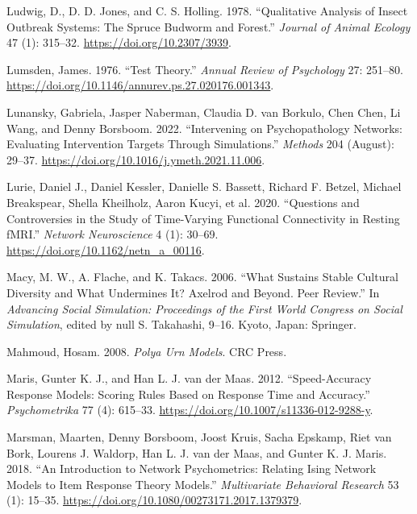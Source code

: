 \documentclass[
  a4paper,
  DIV=11,
  numbers=noendperiod,
  oneside]{scrreprt}
\newlength{\cslhangindent}
\newenvironment{CSLReferences}[2] %
 {\begin{list}{}{%
  \setlength{\itemindent}{0pt}
  \setlength{\leftmargin}{0pt}
  \setlength{\parsep}{0pt}
  \ifodd #1
   \setlength{\leftmargin}{\cslhangindent}
   \setlength{\itemindent}{-1\cslhangindent}
  \fi
  \setlength{\itemsep}{#2\baselineskip}}}
 {\end{list}}
\begin{document}
\begin{CSLReferences}{1}{0}
Ludwig, D., D. D. Jones, and C. S. Holling. 1978. {``Qualitative
Analysis of Insect Outbreak Systems: The Spruce Budworm and Forest.''}
\emph{Journal of Animal Ecology} 47 (1): 315--32.
\url{https://doi.org/10.2307/3939}.

Lumsden, James. 1976. {``Test Theory.''} \emph{Annual Review of
Psychology} 27: 251--80.
\url{https://doi.org/10.1146/annurev.ps.27.020176.001343}.

Lunansky, Gabriela, Jasper Naberman, Claudia D. van Borkulo, Chen Chen,
Li Wang, and Denny Borsboom. 2022. {``Intervening on Psychopathology
Networks: {Evaluating} Intervention Targets Through Simulations.''}
\emph{Methods} 204 (August): 29--37.
\url{https://doi.org/10.1016/j.ymeth.2021.11.006}.

Lurie, Daniel J., Daniel Kessler, Danielle S. Bassett, Richard F.
Betzel, Michael Breakspear, Shella Kheilholz, Aaron Kucyi, et al. 2020.
{``Questions and Controversies in the Study of Time-Varying Functional
Connectivity in Resting {fMRI}.''} \emph{Network Neuroscience} 4 (1):
30--69. \url{https://doi.org/10.1162/netn_a_00116}.

Macy, M. W., A. Flache, and K. Takacs. 2006. {``What {Sustains Stable
Cultural Diversity} and {What Undermines It}? {Axelrod} and Beyond.
{Peer} Review.''} In \emph{Advancing {Social Simulation}: {Proceedings}
of the {First World Congress} on {Social Simulation}}, edited by null S.
Takahashi, 9--16. {Kyoto, Japan}: {Springer}.

Mahmoud, Hosam. 2008. \emph{Polya {Urn Models}}. {CRC Press}.

Maris, Gunter K. J., and Han L. J. van der Maas. 2012. {``Speed-Accuracy
Response Models: {Scoring} Rules Based on Response Time and Accuracy.''}
\emph{Psychometrika} 77 (4): 615--33.
\url{https://doi.org/10.1007/s11336-012-9288-y}.

Marsman, Maarten, Denny Borsboom, Joost Kruis, Sacha Epskamp, Riet van
Bork, Lourens J. Waldorp, Han L. J. van der Maas, and Gunter K. J.
Maris. 2018. {``An Introduction to Network Psychometrics: Relating Ising
Network Models to Item Response Theory Models.''} \emph{Multivariate
Behavioral Research} 53 (1): 15--35.
\url{https://doi.org/10.1080/00273171.2017.1379379}.


\end{CSLReferences}
\end{document}
